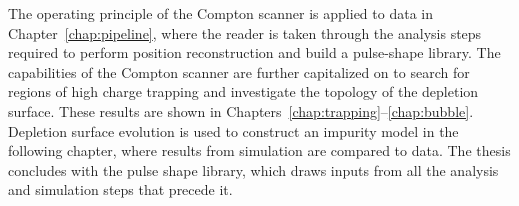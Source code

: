The operating principle of the Compton scanner is applied to data in Chapter~\ref{chap:pipeline}, where the reader is taken through the analysis steps required to perform position reconstruction and build a pulse-shape library. The capabilities of the Compton scanner are further capitalized on to search for regions of high charge trapping and investigate the topology of the depletion surface. These results are shown in Chapters~\ref{chap:trapping}--\ref{chap:bubble}. Depletion surface evolution is used to construct an impurity model in the following chapter, where results from simulation are compared to data. The thesis concludes with the pulse shape library, which draws inputs from all the analysis and simulation steps that precede it. 